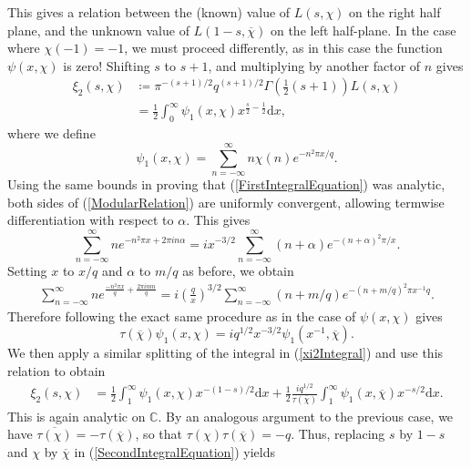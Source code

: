 This gives a relation between the (known) value of $L(s, \chi)$ on the right half plane, and the unknown value of $L(1-s, \overline{\chi})$ on the left half-plane. In the case where $\chi(-1) = -1$, we must proceed differently, as in this case the function $\psi(x, \chi)$ is zero! Shifting $s$ to $s + 1$, and multiplying by another factor of $n$ gives
\begin{align}
\label{xi2Integral}
    \xi_{2}(s, \chi) &\coloneqq \pi^{-(s + 1)/2}q^{(s + 1)/2} \Gamma\left(\frac12(s + 1)\right) L(s, \chi) \nonumber \\
    &= \frac12 \int_{0}^{\infty} \psi_{1}(x, \chi) x^{\frac{s}{2} - \frac12}\mathrm{d} x,
\end{align}
where we define 
\begin{equation}
    \psi_1(x, \chi) = \sum_{n=-\infty}^{\infty} n \chi(n) e^{-n^{2} \pi x / q}. \nonumber
\end{equation}
Using the same bounds in proving that (\ref{FirstIntegralEquation}) was analytic, both sides of (\ref{ModularRelation}) are uniformly convergent, allowing termwise differentiation with respect to $\alpha$. This gives
\begin{equation}
    \sum_{n=-\infty}^{\infty} n e^{-n^{2}\pi x + 2\pi i n \alpha} = i x^{-3/2} \sum_{n=-\infty}^{\infty}(n + \alpha) e^{-(n + \alpha)^{2}\pi/x}. \nonumber
\end{equation}
Setting $x$ to $x/q$ and $\alpha$ to $m/q$ as before, we obtain
\begin{align}
    \sum_{n=-\infty}^{\infty} n e^{\frac{-n^{2}\pi x}{q} + \frac{2\pi i n m}{q}} = i\left( \frac{q}{x} \right)^{3/2} \sum_{n=-\infty}^{\infty} (n + m/q) e^{-(n + m/q)^{2}\pi x^{-1} q}. \nonumber
\end{align}
Therefore following the exact same procedure as in the case of $\psi(x, \chi)$ gives
\begin{equation}
    \tau(\overline{\chi}) \psi_1(x, \chi) = i q^{1/2} x^{-3/2} \psi_{1}(x^{-1}, \overline{\chi}). \nonumber
\end{equation}
We then apply a similar splitting of the integral in (\ref{xi2Integral}) and use this relation to obtain
\begin{align}
\label{SecondIntegralEquation}
    \xi_2(s, \chi) &= \frac12 \int_{1}^{\infty}\psi_1(x, \chi) x^{-(1 - s)/2} \mathrm{d} x + \frac12 \frac{i q^{1/2}}{\tau(\overline{\chi})}\int_{1}^{\infty} \psi_1(x, \overline{\chi})x^{-s/2} \mathrm{d} x.  
\end{align}
This is again analytic on $\mathbb{C}$. By an analogous argument to the previous case, we have $\overline{\tau(\chi)} = -\tau(\overline{\chi})$, so that $\tau(\chi)\tau(\overline{\chi}) = -q$. Thus, replacing $s$ by $1-s$ and $\chi$ by $\overline{\chi}$ in (\ref{SecondIntegralEquation}) yields
